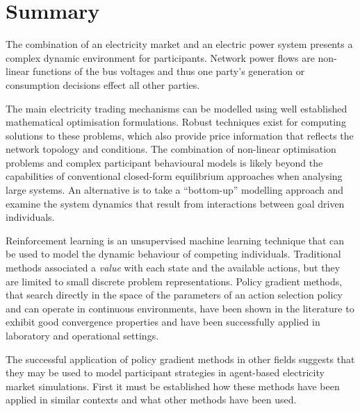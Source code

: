 \section{Summary}
The combination of an electricity market and an electric power system presents
a complex dynamic environment for participants.  Network power flows are
non-linear functions of the bus voltages and thus one party's generation or
consumption decisions effect all other parties.

The main electricity trading mechanisms can be modelled using well established
mathematical optimisation formulations.  Robust techniques exist for computing
solutions to these problems, which also provide price information that reflects
the network topology and conditions. The combination of non-linear optimisation
problems and complex participant behavioural models is likely beyond the
capabilities of conventional closed-form equilibrium approaches when analysing
large systems. An alternative is to take a ``bottom-up'' modelling approach and
examine the system dynamics that result from interactions between goal driven
individuals.

Reinforcement learning is an unsupervised machine learning technique that can be
used to model the dynamic behaviour of competing individuals.  Traditional
methods associated a \textit{value} with each state and the available actions,
but they are limited to small discrete problem representations.  Policy gradient
methods, that search directly in the space of the parameters of an action
selection policy and can operate in continuous environments, have been shown in
the literature to exhibit good convergence properties and have been successfully
applied in laboratory and operational settings.

The successful application of policy gradient methods in other fields suggests
that they may be used to model participant strategies in
agent-based electricity market simulations.  First it must be established how
these methods have been applied in similar contexts and what other methods have
been used.
